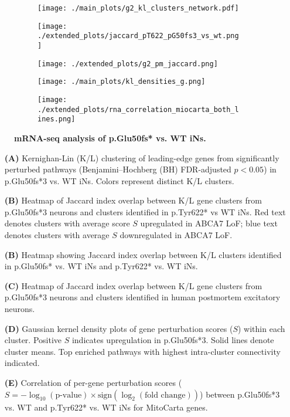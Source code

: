 \begin{figure}[H]
    \begin{subfigure}[t]{.3\textwidth}
        \caption{}
        \texttt{[image: ./main\_plots/g2\_kl\_clusters\_network.pdf]}        
    \end{subfigure}
    \begin{subfigure}[t]{.3\textwidth}
        \caption{}
        \texttt{[image: ./extended\_plots/jaccard\_pT622\_pG50fs3\_vs\_wt.png]}        
    \end{subfigure}
    \begin{subfigure}[t]{.3\textwidth}
        \caption{}
        \texttt{[image: ./extended\_plots/g2\_pm\_jaccard.png]}        
    \end{subfigure}
    \begin{subfigure}[t]{.6\textwidth}
        \caption{}
        \texttt{[image: ./main\_plots/kl\_densities\_g.png]}        
    \end{subfigure}
    \hspace{0.5cm}
    \begin{subfigure}[t]{.3\textwidth}
        \caption{}
        \texttt{[image: ./extended\_plots/rna\_correlation\_miocarta\_both\_lines.png]}        
    \end{subfigure}
    \caption{
        \textbf{mRNA-seq analysis of p.Glu50fs* vs. WT iNs.}\\
    }
    \label{fig:bulk_RNAseq_supplement}
\end{figure}
\begin{itemize}
    \item[\textbf{(A)}] Kernighan-Lin (K/L) clustering of leading-edge genes from significantly perturbed pathways (Benjamini–Hochberg (BH) FDR-adjusted $p<0.05$) in p.Glu50fs*3 vs. WT iNs. Colors represent distinct K/L clusters.
    \item[\textbf{(B)}] Heatmap of Jaccard index overlap between K/L gene clusters from p.Glu50fs*3 neurons and clusters identified in p.Tyr622* vs WT iNs. Red text denotes clusters with average score $S$ upregulated in ABCA7 LoF; blue text denotes clusters with average $S$ downregulated in ABCA7 LoF.
    \item[\textbf{(B)}] Heatmap showing Jaccard index overlap between K/L clusters identified in p.Glu50fs* vs. WT iNs and p.Tyr622* vs. WT iNs.
    \item[\textbf{(C)}] Heatmap of Jaccard index overlap between K/L gene clusters from p.Glu50fs*3 neurons and clusters identified in human postmortem excitatory neurons.
    \item[\textbf{(D)}] Gaussian kernel density plots of gene perturbation scores ($S$) within each cluster. Positive $S$ indicates upregulation in p.Glu50fs*3. Solid lines denote cluster means. Top enriched pathways with highest intra-cluster connectivity indicated.
    \item[\textbf{(E)}] Correlation of per-gene perturbation scores ($S = -\log_{10}(\text{p-value}) \times \text{sign}(\log_2(\text{fold change}))$) between p.Glu50fs*3 vs. WT and p.Tyr622* vs. WT iNs for MitoCarta genes.
\end{itemize}